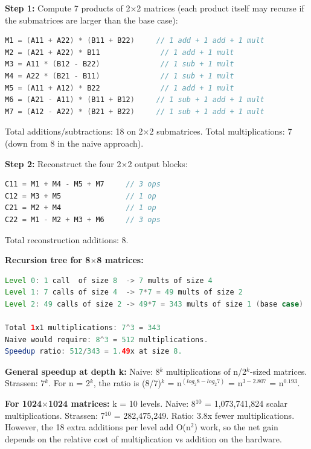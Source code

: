 \textbf{Step 1:} Compute 7 products of 2$\times$2 matrices (each product itself may recurse if the submatrices are larger than the base case):

\begin{lstlisting}[language=Java]
M1 = (A11 + A22) * (B11 + B22)     // 1 add + 1 add + 1 mult
M2 = (A21 + A22) * B11              // 1 add + 1 mult
M3 = A11 * (B12 - B22)              // 1 sub + 1 mult
M4 = A22 * (B21 - B11)              // 1 sub + 1 mult
M5 = (A11 + A12) * B22              // 1 add + 1 mult
M6 = (A21 - A11) * (B11 + B12)     // 1 sub + 1 add + 1 mult
M7 = (A12 - A22) * (B21 + B22)     // 1 sub + 1 add + 1 mult
\end{lstlisting}

Total additions/subtractions: 18 on 2$\times$2 submatrices. Total multiplications: 7 (down from 8 in the naive approach).

\textbf{Step 2:} Reconstruct the four 2$\times$2 output blocks:

\begin{lstlisting}[language=Java]
C11 = M1 + M4 - M5 + M7     // 3 ops
C12 = M3 + M5               // 1 op
C21 = M2 + M4               // 1 op
C22 = M1 - M2 + M3 + M6     // 3 ops
\end{lstlisting}

Total reconstruction additions: 8.

\textbf{Recursion tree for 8$\times$8 matrices:}

\begin{lstlisting}[language=Java]
Level 0: 1 call  of size 8  -> 7 mults of size 4
Level 1: 7 calls of size 4  -> 7*7 = 49 mults of size 2
Level 2: 49 calls of size 2 -> 49*7 = 343 mults of size 1 (base case)

Total 1x1 multiplications: 7^3 = 343
Naive would require: 8^3 = 512 multiplications.
Speedup ratio: 512/343 = 1.49x at size 8.
\end{lstlisting}

\textbf{General speedup at depth k:} Naive: 8$^{k}$ multiplications of n/2$^{k}$-sized matrices. Strassen: 7$^{k}$. For n = 2$^{k}$, the ratio is (8/7)$^{k}$ = n$^{(log_{2}8 - log_{2}7)}$ = n$^{3 - 2.807}$ = n$^{0.193}$.

\textbf{For 1024$\times$1024 matrices:} k = 10 levels. Naive: 8$^{10}$ = 1,073,741,824 scalar multiplications. Strassen: 7$^{10}$ = 282,475,249. Ratio: 3.8x fewer multiplications. However, the 18 extra additions per level add O(n$^{2}$) work, so the net gain depends on the relative cost of multiplication vs addition on the hardware.

